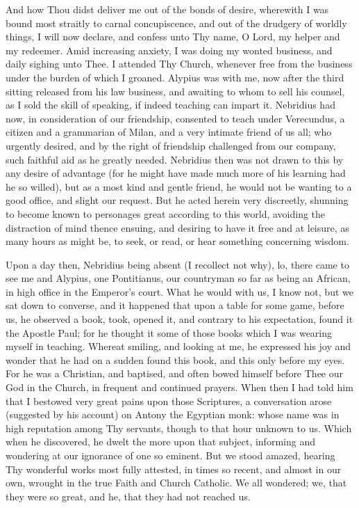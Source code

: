 \documentclass[b5paper,openright,12pt,twoside]{book}
\begin{document}
And how Thou didst deliver me out of the bonds of desire, wherewith I
was bound most straitly to carnal concupiscence, and out of the drudgery
of worldly things, I will now declare, and confess unto Thy name, O
Lord, my helper and my redeemer. Amid increasing anxiety, I was doing
my wonted business, and daily sighing unto Thee. I attended Thy Church,
whenever free from the business under the burden of which I groaned.
Alypius was with me, now after the third sitting released from his law
business, and awaiting to whom to sell his counsel, as I sold the skill
of speaking, if indeed teaching can impart it. Nebridius had now, in
consideration of our friendship, consented to teach under Verecundus, a
citizen and a grammarian of Milan, and a very intimate friend of us all;
who urgently desired, and by the right of friendship challenged from our
company, such faithful aid as he greatly needed. Nebridius then was not
drawn to this by any desire of advantage (for he might have made much
more of his learning had he so willed), but as a most kind and gentle
friend, he would not be wanting to a good office, and slight our
request. But he acted herein very discreetly, shunning to become known
to personages great according to this world, avoiding the distraction
of mind thence ensuing, and desiring to have it free and at leisure, as
many hours as might be, to seek, or read, or hear something concerning
wisdom.

Upon a day then, Nebridius being absent (I recollect not why), lo, there
came to see me and Alypius, one Pontitianus, our countryman so far as
being an African, in high office in the Emperor's court. What he would
with us, I know not, but we sat down to converse, and it happened that
upon a table for some game, before us, he observed a book, took, opened
it, and contrary to his expectation, found it the Apostle Paul; for he
thought it some of those books which I was wearing myself in teaching.
Whereat smiling, and looking at me, he expressed his joy and wonder that
he had on a sudden found this book, and this only before my eyes. For he
was a Christian, and baptised, and often bowed himself before Thee our
God in the Church, in frequent and continued prayers. When then I had
told him that I bestowed very great pains upon those Scriptures, a
conversation arose (suggested by his account) on Antony the Egyptian
monk: whose name was in high reputation among Thy servants, though to
that hour unknown to us. Which when he discovered, he dwelt the more
upon that subject, informing and wondering at our ignorance of one so
eminent. But we stood amazed, hearing Thy wonderful works most fully
attested, in times so recent, and almost in our own, wrought in the true
Faith and Church Catholic. We all wondered; we, that they were so great,
and he, that they had not reached us.
\end{document}

